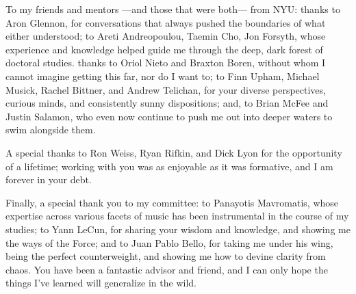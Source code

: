 To my friends and mentors ---and those that were both--- from NYU:
thanks to Aron Glennon, for conversations that always pushed the boundaries of what either understood;
to Areti Andreopoulou, Taemin Cho, Jon Forsyth, whose experience and knowledge helped guide me through the deep, dark forest of doctoral studies.
thanks to Oriol Nieto and Braxton Boren, without whom I cannot imagine getting this far, nor do I want to;
to Finn Upham, Michael Musick, Rachel Bittner, and Andrew Telichan, for your diverse perspectives, curious minds, and consistently sunny dispositions;
and, to Brian McFee and Justin Salamon, who even now continue to push me out into deeper waters to swim alongside them.

A special thanks to Ron Weiss, Ryan Rifkin, and Dick Lyon for the opportunity of a lifetime;
working with you was as enjoyable as it was formative, and I am forever in your debt.

Finally, a special thank you to my committee:
to Panayotis Mavromatis, whose expertise across various facets of music has been instrumental in the course of my studies;
to Yann LeCun, for sharing your wisdom and knowledge, and showing me the ways of the Force;
and to Juan Pablo Bello, for taking me under his wing, being the perfect counterweight, and showing me how to devine clarity from chaos.
You have been a fantastic advisor and friend, and I can only hope the things I've learned will generalize in the wild.



